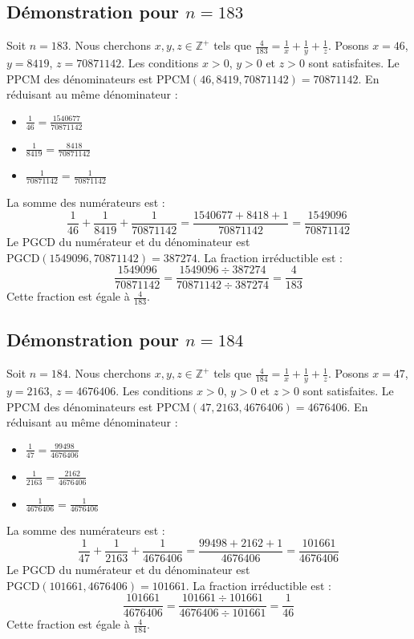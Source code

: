 \documentclass[11pt,a4paper]{article}
\begin{document}
\subsection{Démonstration pour $n = 183$}
Soit $n = 183$. Nous cherchons $x, y, z \in \mathbb{Z}^{+}$ tels que $\frac{4}{183} = \frac{1}{x} + \frac{1}{y} + \frac{1}{z}$.
Posons $x = 46$, $y = 8419$, $z = 70871142$.
Les conditions $x > 0$, $y > 0$ et $z > 0$ sont satisfaites.
Le PPCM des dénominateurs est $\text{PPCM}(46, 8419, 70871142) = 70871142$.
En réduisant au même dénominateur :
\begin{itemize}
    \item $\frac{1}{46} = \frac{1540677}{70871142}$
    \item $\frac{1}{8419} = \frac{8418}{70871142}$
    \item $\frac{1}{70871142} = \frac{1}{70871142}$
\end{itemize}
La somme des numérateurs est :
$$ \frac{1}{46} + \frac{1}{8419} + \frac{1}{70871142} = \frac{1540677 + 8418 + 1}{70871142} = \frac{1549096}{70871142} $$
Le PGCD du numérateur et du dénominateur est $\text{PGCD}(1549096, 70871142) = 387274$.
La fraction irréductible est :
$$ \frac{1549096}{70871142} = \frac{1549096 \div 387274}{70871142 \div 387274} = \frac{4}{183} $$
Cette fraction est égale à $\frac{4}{183}$.

\subsection{Démonstration pour $n = 184$}
Soit $n = 184$. Nous cherchons $x, y, z \in \mathbb{Z}^{+}$ tels que $\frac{4}{184} = \frac{1}{x} + \frac{1}{y} + \frac{1}{z}$.
Posons $x = 47$, $y = 2163$, $z = 4676406$.
Les conditions $x > 0$, $y > 0$ et $z > 0$ sont satisfaites.
Le PPCM des dénominateurs est $\text{PPCM}(47, 2163, 4676406) = 4676406$.
En réduisant au même dénominateur :
\begin{itemize}
    \item $\frac{1}{47} = \frac{99498}{4676406}$
    \item $\frac{1}{2163} = \frac{2162}{4676406}$
    \item $\frac{1}{4676406} = \frac{1}{4676406}$
\end{itemize}
La somme des numérateurs est :
$$ \frac{1}{47} + \frac{1}{2163} + \frac{1}{4676406} = \frac{99498 + 2162 + 1}{4676406} = \frac{101661}{4676406} $$
Le PGCD du numérateur et du dénominateur est $\text{PGCD}(101661, 4676406) = 101661$.
La fraction irréductible est :
$$ \frac{101661}{4676406} = \frac{101661 \div 101661}{4676406 \div 101661} = \frac{1}{46} $$
Cette fraction est égale à $\frac{4}{184}$.
\end{document}
